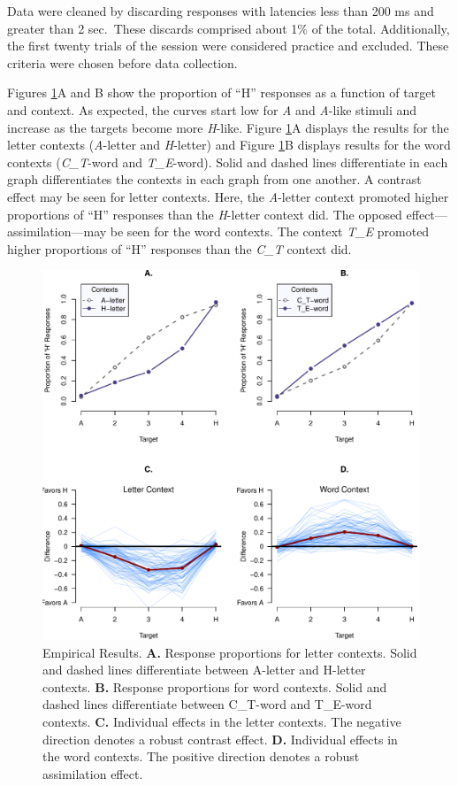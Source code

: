\documentclass[english,floatsintext,man]{apa6}
\theoremstyle{definition}
\theoremstyle{definition}
\theoremstyle{remark}
\begin{document}
Data were cleaned by discarding responses with latencies less than 200
ms and greater than 2 sec.~These discards comprised about 1\% of the
total. Additionally, the first twenty trials of the session were
considered practice and excluded. These criteria were chosen before data
collection.

Figures \ref{fig:avcfigures}A and B show the proportion of \enquote{H}
responses as a function of target and context. As expected, the curves
start low for \emph{A} and \emph{A}-like stimuli and increase as the
targets become more \emph{H}-like. Figure \ref{fig:avcfigures}A displays
the results for the letter contexts (\emph{A}-letter and
\emph{H}-letter) and Figure \ref{fig:avcfigures}B displays results for
the word contexts (\emph{C\_T}-word and \emph{T\_E}-word). Solid and
dashed lines differentiate in each graph differentiates the contexts in
each graph from one another. A contrast effect may be seen for letter
contexts. Here, the \emph{A}-letter context promoted higher proportions
of \enquote{H} responses than the \emph{H}-letter context did. The
opposed effect---assimilation---may be seen for the word contexts. The
context \emph{T\_E} promoted higher proportions of \enquote{H} responses
than the \emph{C\_T} context did.

\begin{figure}[htbp]
\centering
\includegraphics{paper_files/figure-latex/avcfigures-1.pdf}
\caption{\label{fig:avcfigures}Empirical Results. \textbf{A.} Response
proportions for letter contexts. Solid and dashed lines differentiate
between A-letter and H-letter contexts. \textbf{B.} Response proportions
for word contexts. Solid and dashed lines differentiate between
C\_T-word and T\_E-word contexts. \textbf{C.} Individual effects in the
letter contexts. The negative direction denotes a robust contrast
effect. \textbf{D.} Individual effects in the word contexts. The
positive direction denotes a robust assimilation effect.}
\end{figure}
\end{document}
